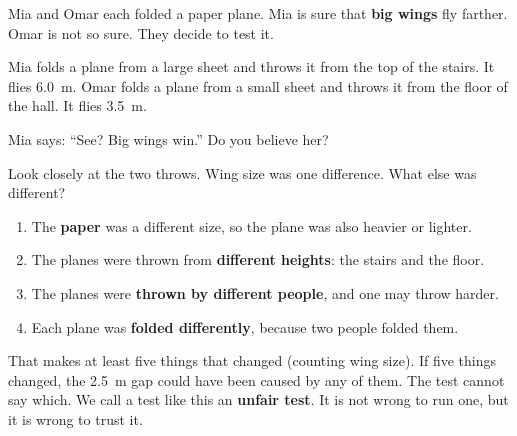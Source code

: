 \label{ch1}

Mia and Omar each folded a paper plane. Mia is sure that \textbf{big wings} fly farther. Omar is not so sure. They decide to test it.

Mia folds a plane from a large sheet and throws it from the top of the stairs. It flies 6.0~m. Omar folds a plane from a small sheet and throws it from the floor of the hall. It flies 3.5~m.

\begin{center}
\end{center}

Mia says: ``See? Big wings win.'' Do you believe her?

Look closely at the two throws. Wing size was one difference. What else was different?

\begin{enumerate}[leftmargin=1.6em,itemsep=0.15em]
\item The \textbf{paper} was a different size, so the plane was also heavier or lighter.
\item The planes were thrown from \textbf{different heights}: the stairs and the floor.
\item The planes were \textbf{thrown by different people}, and one may throw harder.
\item Each plane was \textbf{folded differently}, because two people folded them.
\end{enumerate}

That makes at least five things that changed (counting wing size). If five things changed, the 2.5~m gap could have been caused by any of them. The test cannot say which. We call a test like this an \textbf{unfair test}. It is not wrong to run one, but it is wrong to trust it.


